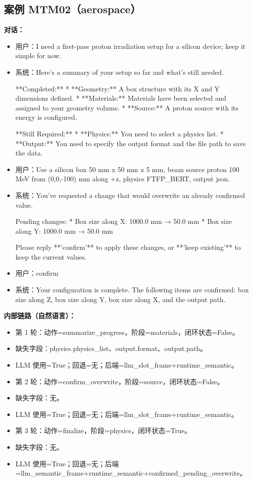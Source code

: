 \documentclass[11pt]{ctexart}
\begin{document}
\subsection{案例 MTM02（aerospace）}
\textbf{对话：}
\begin{itemize}
\item 用户：I need a first-pass proton irradiation setup for a silicon device; keep it simple for now.
\item 系统：Here's a summary of your setup so far and what's still needed.

**Completed:**
*   **Geometry:** A box structure with its X and Y dimensions defined.
*   **Materials:** Materials have been selected and assigned to your geometry volume.
*   **Source:** A proton source with its energy is configured.

**Still Required:**
*   **Physics:** You need to select a physics list.
*   **Output:** You need to specify the output format and the file path to save the data.
\item 用户：Use a silicon box 50 mm x 50 mm x 5 mm, beam source proton 100 MeV from (0,0,-100) mm along +z, physics FTFP\_BERT, output json.
\item 系统：You've requested a change that would overwrite an already confirmed value.

Pending changes:
*   Box size along X: 1000.0 mm → 50.0 mm
*   Box size along Y: 1000.0 mm → 50.0 mm

Please reply **'confirm'** to apply these changes, or **'keep existing'** to keep the current values.
\item 用户：confirm
\item 系统：Your configuration is complete. The following items are confirmed: box size along Z, box size along Y, box size along X, and the output path.
\end{itemize}
\textbf{内部链路（自然语言）：}
\begin{itemize}
\item 第 1 轮：动作=summarize\_progress，阶段=materials，闭环状态=False。
\item 缺失字段：physics.physics\_list、output.format、output.path。
\item LLM 使用=True；回退=无；后端=llm\_slot\_frame+runtime\_semantic。
\item 第 2 轮：动作=confirm\_overwrite，阶段=source，闭环状态=False。
\item 缺失字段：无。
\item LLM 使用=True；回退=无；后端=llm\_slot\_frame+runtime\_semantic。
\item 第 3 轮：动作=finalize，阶段=physics，闭环状态=True。
\item 缺失字段：无。
\item LLM 使用=True；回退=无；后端=llm\_semantic\_frame+runtime\_semantic+confirmed\_pending\_overwrite。
\end{itemize}
\end{document}
